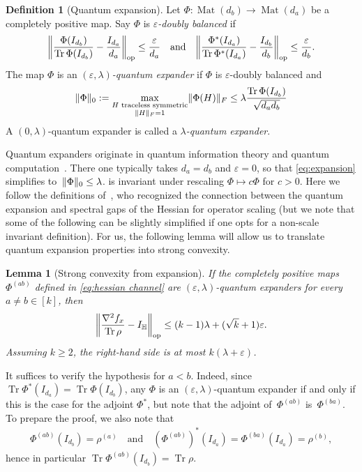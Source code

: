 \documentclass[aos]{imsart}
\newtheorem{lemma}[theorem]{Lemma}
\theoremstyle{definition}
\newtheorem{definition}[theorem]{Definition}
\numberwithin{equation}{section}
\DeclareMathOperator{\op}{op}
\DeclareMathOperator{\Mat}{Mat}
\DeclareMathOperator{\tr}{Tr}
\DeclarePairedDelimiter{\norm}{\lVert}{\rVert}
\renewcommand{\H}{{\mathbb{H}}}
\newcommand{\eps}{\varepsilon}
\begin{document}
\begin{definition}[Quantum expansion]\label{def:expansion}
Let $\Phi\colon\Mat(d_b) \to \Mat(d_a)$ be a completely positive map.
Say $\Phi$ is \emph{$\eps$-doubly balanced} if
\begin{align}\label{eq:doubly balanced}
  \norm*{\frac{\Phi(I_{d_b})}{\tr \Phi(I_{d_b})} - \frac{I_{d_a}}{d_a}}_{\op} \leq \frac\eps{d_a}
\quad\text{and}\quad
  \norm*{\frac{\Phi^*(I_{d_a})}{\tr \Phi^*(I_{d_a})} - \frac{I_{d_b}}{d_b}}_{\op} \leq \frac\eps{d_b}.
\end{align}
The map $\Phi$ is an \emph{$(\eps, \lambda)$-quantum expander} if $\Phi$ is $\eps$-doubly balanced and
\begin{align}\label{eq:expansion}
  \norm{\Phi}_0 := \max_{\substack{H \text{ traceless symmetric} \\ \norm H_F=1}} \norm{\Phi(H)}_F
\leq \lambda \frac{\tr \Phi(I_{d_b})}{\sqrt{d_ad_b}}
\end{align}
A $(0, \lambda)$-quantum expander is called a \emph{$\lambda$-quantum expander}.
\end{definition}

\noindent
Quantum expanders originate in quantum information theory and quantum computation~\cite{H07}.
There one typically takes $d_a=d_b$ and $\eps=0$, so that \cref{eq:expansion} simplifies to~$\norm{\Phi}_0 \leq \lambda$.
 is invariant under rescaling $\Phi \mapsto c\Phi$ for $c>0$.
Here we follow the definitions of~\cite{KLR19,FM20}, who recognized the connection between the quantum expansion and spectral gaps of the Hessian for operator scaling (but we note that some of the following can be slightly simplified if one opts for a non-scale invariant definition).
For us, the following lemma will allow us to translate quantum expansion properties into strong convexity.

\begin{lemma}[Strong convexity from expansion]\label{lem:expansion-convexity}
If the completely positive maps $\Phi^{(ab)}$ defined in \cref{eq:hessian channel} are $(\eps,\lambda)$-quantum expanders for every $a\neq b\in[k]$, then
\begin{align*}
  \norm*{\frac{\nabla^2 f_x}{\tr \rho} - I_\H}_{\op}
\leq (k-1)\lambda + (\sqrt k + 1) \eps.
\end{align*}
Assuming $k\geq2$, the right-hand side is at most $k (\lambda + \eps)$.
\end{lemma}
\noindent
It suffices to verify the hypothesis for $a<b$.
Indeed, since $\tr \Phi^*(I_{d_a}) = \tr \Phi(I_{d_b})$, any $\Phi$ is an $(\eps,\lambda)$-quantum expander if and only if this is the case for the adjoint $\Phi^*$, but note that the adjoint of~$\Phi^{(ab)}$ is~$\Phi^{(ba)}$.
To prepare the proof, we also note that
\begin{align}\label{eq:channel to single marginals}
   \Phi^{(ab)}(I_{d_b}) = \rho^{(a)}
\quad\text{and}\quad
   (\Phi^{(ab)})^*(I_{d_a}) = \Phi^{(ba)}(I_{d_a}) = \rho^{(b)},
\end{align}
hence in particular $\tr \Phi^{(ab)}(I_{d_b}) = \tr \rho$.
\end{document}
